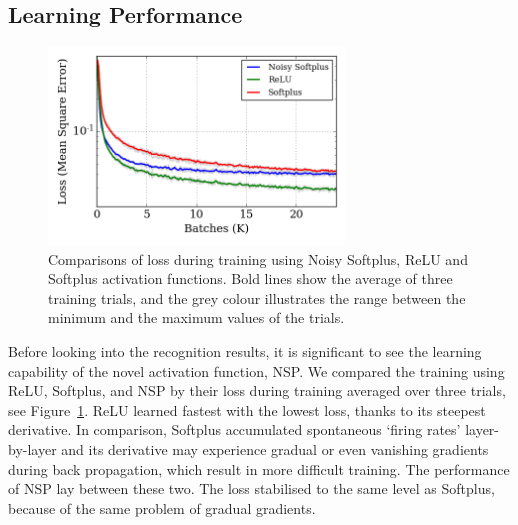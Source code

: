 	\subsection{Learning Performance}
	\label{subsec:result_compare}
	\begin{figure}[tbp!]
		\centering
		\DIFdelbeginFL %
\DIFdelendFL \DIFaddbeginFL \includegraphics[width=0.7\textwidth]{pics_iconip/revise_8.png}
		\DIFaddendFL \caption[Comparisons of loss during training.]{Comparisons of loss during training using Noisy Softplus, ReLU and Softplus activation functions. Bold lines show the average of three training trials, and the grey colour illustrates the range between the minimum and the maximum values of the trials.  }
		\label{Fig:loss_ns}
	\end{figure}
	Before looking into the recognition results, it is significant to see the learning capability of the novel activation function, NSP.
	We compared the training using ReLU, Softplus, and NSP by their loss during training averaged over three trials, see Figure~\ref{Fig:loss_ns}.
	ReLU learned fastest with the lowest loss, thanks to its steepest derivative.
	In comparison, Softplus accumulated spontaneous `firing rates' layer-by-layer and its derivative may experience gradual or even vanishing gradients during back propagation, which result in more difficult training.
	The \DIFaddbegin {}\DIFaddend performance of NSP lay between these two\DIFdelbegin {}\DIFdelend .
	The loss stabilised to the same level as Softplus, because of the same problem of gradual gradients.

